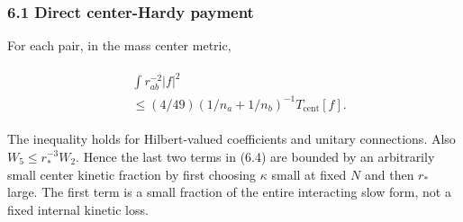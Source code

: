 \subsubsection{6.1 Direct center-Hardy
payment}\label{c-direct-center-hardy-payment}

For each pair, in the mass center metric,

\begin{gather*}
\begin{aligned}
& \int  r_{ab}^{-2} \vert f\vert ^{2} \\
& \le  (4/49)(1/n_{a}+1/n_{b})^{-1} T_{\mathrm{cent}}[f].
\end{aligned}\tag{6.5}
\end{gather*}

The inequality holds for Hilbert-valued coefficients and unitary
connections. Also \(W_{5} \le  r_{*}^{-3} W_{2}\). Hence the last two
terms in (6.4) are bounded by an arbitrarily small center kinetic
fraction by first choosing \(\kappa\) small at fixed \(N\) and then
\(r_{*}\) large. The first term is a small fraction of the entire
interacting slow form, not a fixed internal kinetic loss.
